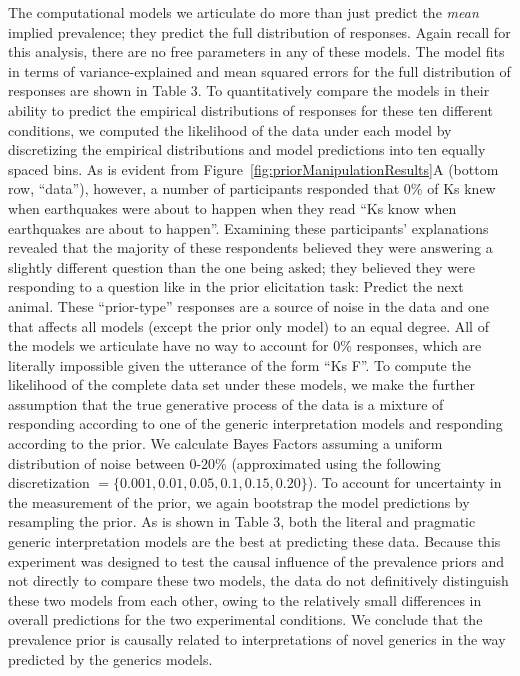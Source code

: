 \documentclass[floatsintext,doc]{apa6}
\begin{document}
The computational models we articulate do more than just predict the \emph{mean} implied prevalence; they predict the full distribution of responses.
Again recall for this analysis, there are no free parameters in any of these models.
The model fits in terms of variance-explained and mean squared errors for the full distribution of responses are shown in Table 3.
To quantitatively compare the models in their ability to predict the empirical distributions of responses for these ten different conditions, we computed the likelihood of the data under each model by discretizing the empirical distributions and model predictions into ten equally spaced bins.
As is evident from Figure~\ref{fig:priorManipulationResults}A (bottom row, \enquote{data}), however, a number of participants responded that 0\% of Ks knew when earthquakes were about to happen when they read \enquote{Ks know when earthquakes are about to happen}.
Examining these participants' explanations revealed that the majority of these respondents believed they were answering a slightly different question than the one being asked; they believed they were responding to a question like in the prior elicitation task: Predict the next animal.
These \enquote{prior-type} responses are a source of noise in the data and one that affects all models (except the prior only model) to an equal degree.
All of the models we articulate have no way to account for 0\% responses, which are literally impossible given the utterance of the form \enquote{Ks F}.
To compute the likelihood of the complete data set under these models, we make the further assumption that the true generative process of the data is a mixture of responding according to one of the generic interpretation models and responding according to the prior.
We calculate Bayes Factors assuming a uniform distribution of noise between 0-20\% (approximated using the following discretization \(= \{0.001, 0.01, 0.05, 0.1, 0.15, 0.20\}\)).
To account for uncertainty in the measurement of the prior, we again bootstrap the model predictions by resampling the prior.
As is shown in Table 3, both the literal and pragmatic generic interpretation models are the best at predicting these data.
Because this experiment was designed to test the causal influence of the prevalence priors and not directly to compare these two models, the data do not definitively distinguish these two models from each other, owing to the relatively small differences in overall predictions for the two experimental conditions.
We conclude that the prevalence prior is causally related to interpretations of novel generics in the way predicted by the generics models.
\end{document}
